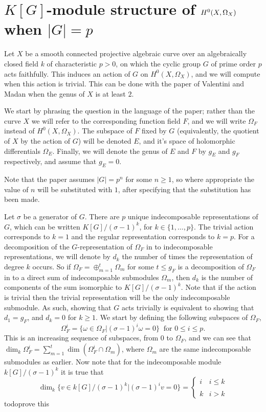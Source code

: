 \section{$K[G]$-module structure of ${H^0(X,\Omega_X)}$ when $|G|=p$}
Let $X$ be a smooth connected projective algebraic curve over an algebraically closed field $k$ of characteristic $p>0$, on which the cyclic group $G$ of prime order $p$ acts faithfully.
This induces an action of $G$ on $H^0(X,\Omega_X)$, and we will compute when this action is trivial.
This can be done with the paper of Valentini and Madan \cite{valmadan} when the genus of $X$ is at least $2$.

We start by phrasing the question in the language of the paper; rather than the curve $X$ we will refer to the corresponding function field $F$, and we will write $\Omega_F$ instead of $H^0(X,\Omega_X)$.
The subspace of $F$ fixed by $G$ (equivalently, the quotient of $X$ by the action of $G$) will be denoted $E$, and it's space of holomorphic differentials $\Omega_E$.
Finally, we will denote the genus of $E$ and $F$ by $g_E$ and $g_F$ respectively, and assume that $g_E=0$.

Note that the paper assumes $|G|=p^n$ for some $n \geq 1$, so where appropriate the value of $n$ will be substituted with $1$, after specifying that the substitution has been made.

Let $\sigma$ be a generator of $G$. 
There are $p$ unique indecomposable representations of $G$, which can be written $K[G]/(\sigma - 1)^k$, for $k\in \{1,\ldots, p\}$.
The trivial action corresponds to $k=1$ and the regular representation corresponds to $k=p$.
For a decomposition of the $G$-representation of $\Omega_F$ in to indecomposable representations, we will denote by $d_k$ the number of times the representation of degree $k$ occurs.
So if $\Omega_F = \oplus_{m=1}^t \Omega_m$ for some $t\leq g_F$ is a decomposition of $\Omega_F$ in to a direct sum of indecomposable submodules $\Omega_m$, then $d_k$ is the number of components of the sum isomorphic to $K[G]/(\sigma -1)^k.$
Note that if the action is trivial then the trivial representation will be the only indecomposable submodule. 
As such, showing that $G$ acts trivially is equivalent to showing that $d_1 = g_F$, and $d_k= 0 $ for $k \geq 1$.
We start by defining the following subspaces of $\Omega_F$,
    \begin{equation*}
    \Omega_F^i = \{\omega\in \Omega_F | (\sigma - 1)^i\omega=0\}\ \mbox{ for } 0\leq i \leq p.
    \end{equation*}
This is an increasing sequence of subspaces, from $0$ to $\Omega_F$, and we can see that $\dim_k\Omega_F^i = \sum_{m=1}^t\dim(\Omega_F^i \cap \Omega_m)$, where $\Omega_m$ are the same indecomposable submodules as earlier.
Now note that for the indecomposable module $k[G]/(\sigma - 1)^k$ it is true that 
    \[
    \dim_k\{v \in k[G]/(\sigma - 1)^k | (\sigma - 1)^iv = 0\} = \left\{     
        \begin{array}{ll}
        i & i\leq k \\
        \\
        k & i > k
        \end{array} 
    \right.
    \]todo{prove this}

